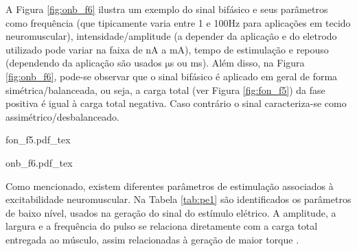 A Figura \ref{fig:onb_f6} ilustra um exemplo do sinal bifásico e seus parâmetros como frequência (que tipicamente varia entre 1 e 100Hz para aplicações em tecido neuromuscular), intensidade/amplitude (a depender da aplicação e do eletrodo utilizado pode variar na faixa de nA a mA), tempo de estimulação e repouso (dependendo da aplicação são usados $\mathrm{\mu}$s ou ms). Além disso, na Figura \ref{fig:onb_f6}, pode-se observar que o sinal bifásico é aplicado em geral de forma simétrica/balanceada, ou seja, a carga total (ver Figura \ref{fig:fon_f5}) da fase positiva é igual à carga total negativa. Caso contrário o sinal caracteriza-se como assimétrico/desbalanceado.

\vspace{0.3cm}

\begin{figure*}[h]
    \centering %
    \small %
    \def\svgwidth{0.9\columnwidth}%
    {fon_f5.pdf_tex}
    \caption{Formatos de onda típicos em aplicações de estimulação elétrica (adaptado de  \cite{Robinson2002EletrofisiologiaEletrofisiologico, Popovic2000ControlDisabled}).}
    \label{fig:fon_f5}
\end{figure*}


\begin{figure*}
    \centering %
    \small %
    \def\svgwidth{1\columnwidth}%
    {onb_f6.pdf_tex}
    \caption{Ondas bifásicas e alguns parâmetros básicos da estimulação elétrica (adaptado de \cite{Faria2006ImplementacaoMedulares}).}
    \label{fig:onb_f6}
\end{figure*}

Como mencionado, existem diferentes parâmetros de estimulação associados à excitabilidade neuromuscular. Na Tabela \ref{tab:pe1} são identificados os parâmetros de baixo nível, usados na geração do sinal do estímulo elétrico. A amplitude, a largura e a frequência do pulso se relaciona diretamente com a carga total entregada ao músculo, assim relacionadas à geração de maior torque \cite{Popovic2000ControlDisabled}. 

\vspace{0.5cm}


